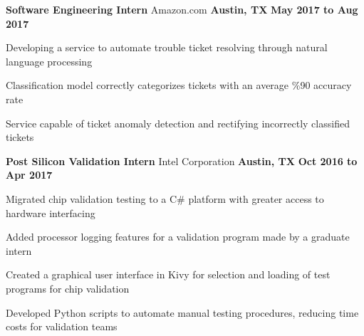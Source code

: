   \begin{cventries}
    \cventry
      {\normalsize \textbf{Software Engineering Intern}}
      {\large Amazon.com}
      {\normalsize \textbf{Austin, TX}}
      {\normalsize \textbf{May 2017 to Aug 2017}}
      {
        \begin{cvitems}
          \item {\normalsize Developing a service to automate trouble ticket resolving through natural language processing}
          \item {\normalsize Classification model correctly categorizes tickets with an average \%90 accuracy rate}
          \item {\normalsize Service capable of ticket anomaly detection and rectifying incorrectly classified tickets}
        \end{cvitems}
      }
    \cventry
      {\normalsize \textbf{Post Silicon Validation Intern}}
      {\large Intel Corporation}
      {\normalsize \textbf{Austin, TX}}
      {\normalsize \textbf{Oct 2016 to Apr 2017}}
      {
        \begin{cvitems}
          \item {\normalsize Migrated chip validation testing to a C\# platform with greater access to hardware interfacing} 
          \item {\normalsize Added processor logging features for a validation program made by a graduate intern}
          \item {\normalsize Created a graphical user interface in Kivy for selection and loading of test programs for chip validation}
          \item {\normalsize Developed Python scripts to automate manual testing procedures, reducing time costs for validation teams}
        \end{cvitems}
      }
  \end{cventries}